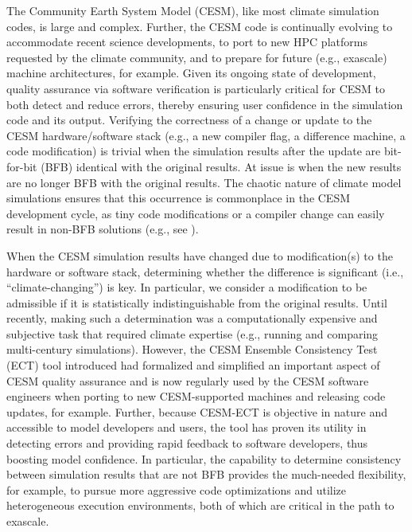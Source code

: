 
The Community Earth System Model (CESM), like most climate simulation
codes, is large and complex.  Further, the CESM code is continually
evolving to accommodate recent science developments, to port to new
HPC platforms requested by the climate community, and to prepare for
future (e.g., exascale) machine architectures, for example. Given its
ongoing state of development, quality assurance via software
verification is particularly critical for CESM to both detect and
reduce errors, thereby ensuring user confidence in the simulation code
and its output. Verifying the correctness of a change or update to the
CESM hardware/software stack (e.g., a new compiler flag, a difference
machine, a code modification) is trivial when the simulation results
after the update are bit-for-bit (BFB) identical with the original
results.  At issue is when the new results are no longer BFB with the
original results.  The chaotic nature of climate model simulations ensures that this
occurrence is commonplace in the CESM development cycle, as tiny code
modifications or a compiler change can easily result in non-BFB solutions
(e.g., see \cite{milroy2016}).

When the CESM simulation results have changed due to modification(s)
to the hardware or software stack, determining whether the difference
is significant (i.e., ``climate-changing'') is key.  In particular, we
consider a modification to be admissible if it is statistically
indistinguishable from the original results.  Until recently, making
such a determination was a computationally expensive and subjective
task that required climate expertise (e.g., running and comparing
multi-century simulations).  However, the CESM Ensemble Consistency
Test (ECT) tool introduced \cite{baker2015} had formalized and
simplified an important aspect of CESM quality assurance and is now
regularly used by the CESM software engineers when porting to new
CESM-supported machines and releasing code updates, for
example. Further, because CESM-ECT is objective in nature and
accessible to model developers and users, the tool has proven its
utility in detecting errors and providing rapid feedback to software
developers, thus boosting model confidence.  In particular, the
capability to determine consistency between simulation results that
are not BFB provides the much-needed flexibility, for example, to
pursue more aggressive code optimizations and utilize heterogeneous
execution environments, both of which are critical in the path to
exascale.


